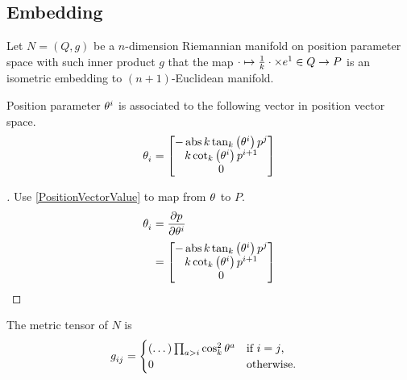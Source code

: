 \documentclass[stu, babel, american, biblatex, a4paper, draftall]{apa7}
\begin{document}
\subsection{Embedding}
\begin{definition}\label{Embedding}
    Let $N=\left(Q,g\right)$ be a $n$-dimension Riemannian manifold
    on position parameter space with such inner product $g$ that
    the map $\cdot\mapsto\frac{1}{k}\cdot\times\tensor{e}{^1}\in Q\to P$ is an isometric embedding to $\left(n+1\right)$-Euclidean manifold.
\end{definition}
\begin{lemma}\label{Model:Basis}
    Position parameter $\tensor{\theta}{^i}$ is associated to the following vector in position vector space.
    \begin{equation*}
        \tensor{\theta}{_i} =
        \begin{bmatrix}
            -\abs{k}\tan_k\left(\tensor{\theta}{^i}\right)\tensor{p}{^j} \\
            k\cot_k\left(\tensor{\theta}{^i}\right)\tensor{p}{^{i+1}}    \\
            0                                                            \\
        \end{bmatrix}
    \end{equation*}
\end{lemma}
\begin{proof}[]
    \skipped

    Use \cref{PositionVectorValue} to map from $\tensor{\theta}{}$ to $P$.
    \begin{align*}
        {\tensor{\theta}{_i}}
         & =
        \frac{\partial\tensor{p}{}}{\partial\tensor{\theta}{^i}} \\
         & =
        \begin{bmatrix}
            -\abs{k}\tan_k\left(\tensor{\theta}{^i}\right)\tensor{p}{^j} \\
            k\cot_k\left(\tensor{\theta}{^i}\right)\tensor{p}{^{i+1}}    \\
            0                                                            \\
        \end{bmatrix}
    \end{align*}
\end{proof}
\begin{lemma}\label{Model:MetricTensor}
    The metric tensor of $N$ is
    \begin{align*}
        \tensor{g}{_i_j} & =
        \begin{cases}
            \left(\dots\right)\prod_{a>i}{\cos_k^2{\tensor{\theta}{^a}}} & \text{if $i=j$,}  \\
            0                                                            & \text{otherwise.} \\
        \end{cases}
    \end{align*}
\end{lemma}
\end{document}
